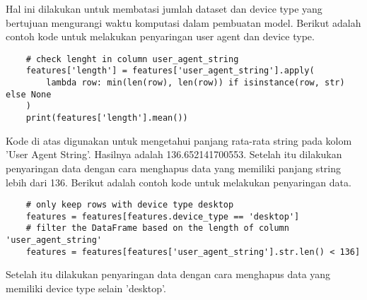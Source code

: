 Hal ini dilakukan untuk membatasi jumlah dataset dan device type yang bertujuan mengurangi waktu komputasi dalam pembuatan model. Berikut adalah contoh kode untuk melakukan penyaringan user agent dan device type. 

\begin{lstlisting}
    # check lenght in column user_agent_string
    features['length'] = features['user_agent_string'].apply(
        lambda row: min(len(row), len(row)) if isinstance(row, str) else None
    )
    print(features['length'].mean())
    \end{lstlisting}

    Kode di atas digunakan untuk mengetahui panjang rata-rata string pada kolom 'User Agent String'. Hasilnya adalah 136.652141700553. 
    Setelah itu dilakukan penyaringan data dengan cara menghapus data yang memiliki panjang string lebih dari 136. Berikut adalah contoh kode untuk melakukan penyaringan data.

\begin{lstlisting}
    # only keep rows with device type desktop
    features = features[features.device_type == 'desktop']
    # filter the DataFrame based on the length of column 'user_agent_string'
    features = features[features['user_agent_string'].str.len() < 136]
    \end{lstlisting}

    Setelah itu dilakukan penyaringan data dengan cara menghapus data yang memiliki device type selain 'desktop'.

